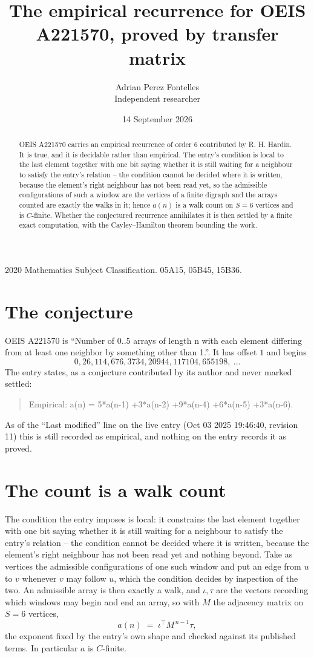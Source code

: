 \documentclass[11pt,a4paper]{article}
\title{The empirical recurrence for OEIS A221570, proved by transfer matrix}
\author{Adrian Perez Fontelles\\ \small Independent researcher}
\date{14 September 2026}
\theoremstyle{plain}
\theoremstyle{definition}
\begin{document}
\maketitle

\begin{abstract}
OEIS A221570 carries an empirical recurrence of order $6$ contributed by R. H. Hardin. It is
true, and it is decidable rather than empirical. The entry's condition is local to the last element together with one bit saying whether it is still waiting for a neighbour to satisfy the entry's relation -- the condition cannot be decided where it is written, because the element's right neighbour has not been read yet, so
the admissible configurations of such a window are the vertices of a finite digraph and the
arrays counted are exactly the walks in it; hence $a(n)$ is a walk count on $S=6$ vertices
and is $C$-finite. Whether the conjectured recurrence annihilates it is then settled by a
finite exact computation, with the Cayley--Hamilton theorem bounding the work.
\end{abstract}

\noindent\small 2020 Mathematics Subject Classification. 05A15, 05B45, 15B36.\normalsize

\section{The conjecture}

OEIS A221570 is ``Number of 0..5 arrays of length n with each element differing from at least one neighbor by something other than 1.''. It has offset $1$ and begins
\[
0, 26, 114, 676, 3734, 20944, 117104, 655198,\ \dots
\]
The entry states, as a conjecture contributed by its author and never marked settled:
\begin{quote}
Empirical: a(n) = 5*a(n-1) +3*a(n-2) +9*a(n-4) +6*a(n-5) +3*a(n-6).
\end{quote}
As of the ``Last modified'' line on the live entry (Oct 03 2025 19:46:40, revision 11) this is still
recorded as empirical, and nothing on the entry records it as proved.

\section{The count is a walk count}

The condition the entry imposes is local: it constrains the last element together with one bit saying whether it is still waiting for a neighbour to satisfy the entry's relation -- the condition cannot be decided where it is written, because the element's right neighbour has not been read yet and nothing beyond. Take as vertices the admissible configurations of one such window and put an edge from $u$ to $v$ whenever $v$ may follow $u$, which the condition decides by inspection of the two.
An admissible array is then exactly a walk, and $\iota,\tau$ are the vectors recording which windows may begin and end an array, so with $M$ the adjacency matrix on $S=6$ vertices,
\[
a(n)\;=\;\iota^{\!\top}M^{\,n-1}\tau ,
\]
the exponent fixed by the entry's own shape and checked against its published terms. In
particular $a$ is $C$-finite.
\end{document}

